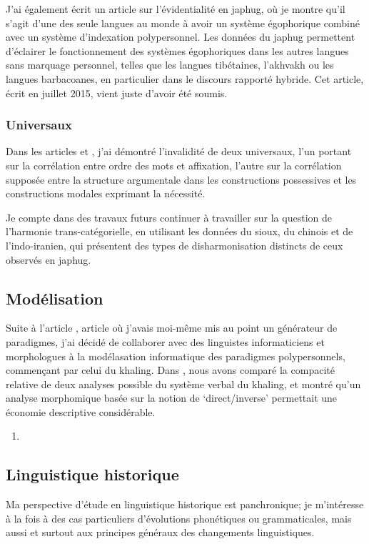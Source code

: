 \documentclass[oldfontcommands,oneside,a4paper,11pt]{article}
\begin{document}
J'ai également écrit un article sur l'évidentialité en japhug, où je montre qu'il s'agit d'une des seule langues au monde à avoir un système égophorique combiné avec un système d'indexation polypersonnel. Les données du japhug permettent d'éclairer le fonctionnement des systèmes égophoriques dans les autres langues sans marquage personnel, telles que les langues tibétaines, l'akhvakh ou les langues barbacoanes, en particulier dans le discours rapporté hybride. Cet article, écrit en juillet 2015, vient juste d'avoir été soumis.

\subsubsection{Universaux}
Dans les articles \citet{jacques13harmonization} et \citet{antonov14need}, j'ai démontré l'invalidité de deux universaux, l'un portant sur la corrélation entre ordre des mots et affixation, l'autre sur la corrélation supposée entre la structure argumentale dans les  constructions possessives et les constructions modales exprimant la nécessité.

Je compte dans des travaux futurs continuer à travailler sur la question de l'harmonie trans-catégorielle, en utilisant les données du sioux, du chinois et de l'indo-iranien, qui présentent des types de disharmonisation distincts de ceux observés en japhug.


\subsection{Modélisation} \label{sec:modelisation}
Suite à l'article \citet{jacques12khaling}, article où j'avais moi-même mis au point un générateur de paradigmes, j'ai décidé de collaborer avec des linguistes informaticiens et morphologues à la modélasation informatique des paradigmes polypersonnels, commençant par celui du khaling. Dans \citet{walther14compactness}, nous avons comparé la compacité relative de deux analyses possible du système verbal du khaling, et montré qu'un analyse morphomique basée sur la notion de `direct/inverse' permettait une économie descriptive considérable.

\begin{enumerate}
 \item  {}
\end{enumerate}

\subsection{Linguistique historique} \label{sec:linghist}
Ma perspective d'étude en linguistique historique est panchronique; je m'intéresse à la fois à des cas particuliers d'évolutions phonétiques ou grammaticales, mais aussi et surtout aux principes généraux des changements linguistiques. 
\end{document}
